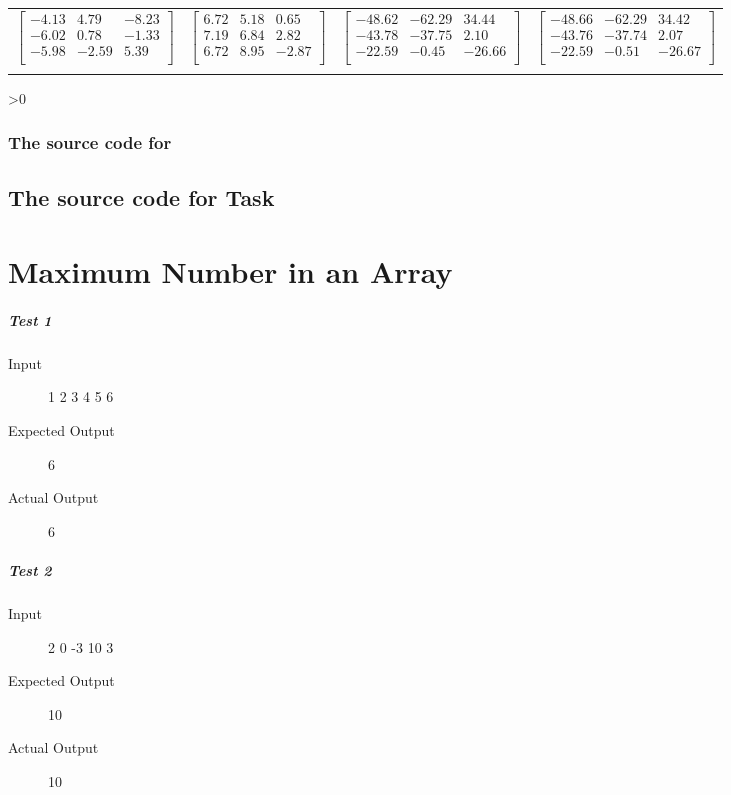 \documentclass[12pt,a4paper,onesided]{report}
\newcommand{\source}{\pagebreak
	\ifnum\value{section}>0
		\subsection{The source code for \thesection}

	\else
		\section{The source code for Task \thechapter}

	\fi
	}
\begin{document}
\begin{table}[h]
{\begin{tabular}{cccc}
				$\begin{bmatrix}-4.13&4.79&-8.23\\-6.02&0.78&-1.33\\-5.98&-2.59&5.39\\\end{bmatrix}$&
				$\begin{bmatrix}6.72&5.18&0.65\\7.19&6.84&2.82\\6.72&8.95&-2.87\\\end{bmatrix}$&
				$\begin{bmatrix}-48.62&-62.29&34.44\\-43.78&-37.75&2.10\\-22.59&-0.45&-26.66\\\end{bmatrix}$&
				$\begin{bmatrix}-48.66&-62.29&34.42\\-43.76&-37.74&2.07\\-22.59&-0.51&-26.67\\\end{bmatrix}$
			\\	&&&	\\
			\bottomrule
		\end{tabular}
	}
\end{table}
\source

\chapter{Maximum Number in an Array}
	\paragraph{Test 1}
		\begin{description}
			\item[Input] 1 2 3 4 5 6 
			\item[Expected Output] 6
			\item[Actual Output] 6
		\end{description}
	\paragraph{Test 2}
		\begin{description}
			\item[Input] 2 0 -3 10 3 
			\item[Expected Output] 10
			\item[Actual Output] 10
	\end{description}
\end{document}
